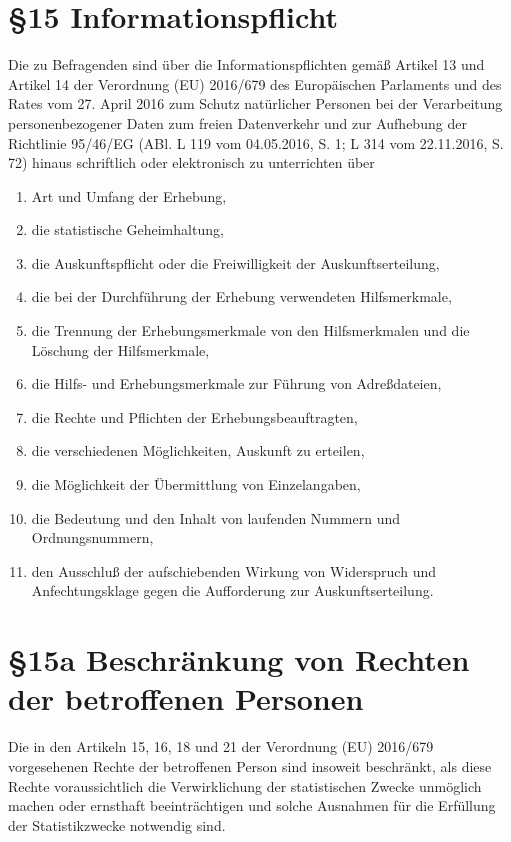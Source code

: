     \section{\S15 Informationspflicht}
    Die zu Befragenden sind über die Informationspflichten gemäß Artikel 13 und Artikel 14 der Verordnung (EU) 2016/679 des Europäischen Parlaments und des Rates vom 27. April 2016 zum Schutz natürlicher Personen bei der Verarbeitung personenbezogener Daten zum freien Datenverkehr und zur Aufhebung der Richtlinie 95/46/EG (ABl. L 119 vom 04.05.2016, S. 1; L 314 vom 22.11.2016, S. 72) hinaus schriftlich oder elektronisch zu unterrichten über
        \begin{enumerate}[label=\arabic*.]
            \item Art und Umfang der Erhebung,
            \item die statistische Geheimhaltung,
            \item die Auskunftspflicht oder die Freiwilligkeit der Auskunftserteilung,
            \item die bei der Durchführung der Erhebung verwendeten Hilfsmerkmale,
            \item die Trennung der Erhebungsmerkmale von den Hilfsmerkmalen und die Löschung der Hilfsmerkmale,
            \item die Hilfs- und Erhebungsmerkmale zur Führung von Adreßdateien,
            \item die Rechte und Pflichten der Erhebungsbeauftragten,
            \item die verschiedenen Möglichkeiten, Auskunft zu erteilen,
            \item die Möglichkeit der Übermittlung von Einzelangaben,
            \item die Bedeutung und den Inhalt von laufenden Nummern und Ordnungsnummern,
            \item den Ausschluß der aufschiebenden Wirkung von Widerspruch und Anfechtungsklage gegen die Aufforderung zur Auskunftserteilung.
        \end{enumerate}

    \section{\S15a Beschränkung von Rechten der betroffenen Personen}
    Die in den Artikeln 15, 16, 18 und 21 der Verordnung (EU) 2016/679 vorgesehenen Rechte der betroffenen Person sind insoweit beschränkt, als diese Rechte voraussichtlich die Verwirklichung der statistischen Zwecke unmöglich machen oder ernsthaft beeinträchtigen und solche Ausnahmen für die Erfüllung der Statistikzwecke notwendig sind.

